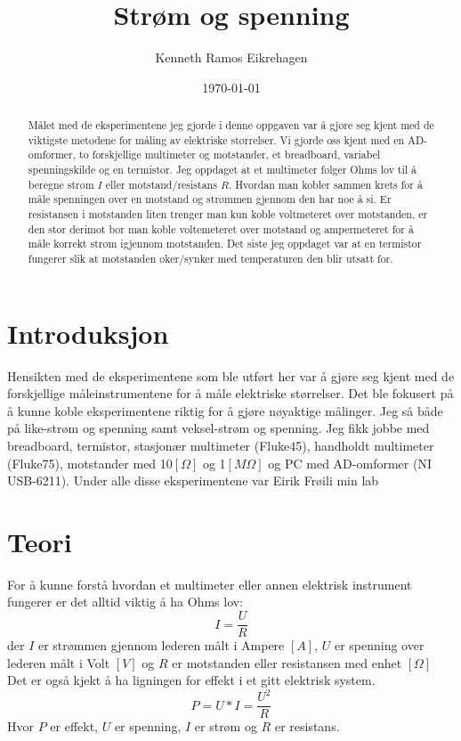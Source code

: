 \documentclass[norsk,a4paper,12pt]{article}
\title{Strøm og spenning}
\author{Kenneth Ramos Eikrehagen}
\date{\today}
\begin{document}
\renewcommand{\abstractname}{\large Sammendrag}
\renewcommand{\contentsname}{\LARGE Innhold}
\renewcommand{\listfigurename}{\Large Figur liste}
\renewcommand{\listtablename}{\Large Tabell liste}

\maketitle
\newpage
\tableofcontents
\listoffigures
\listoftables

\begin{abstract}
Målet med de eksperimentene jeg gjorde i denne oppgaven var å gjøre seg kjent med de viktigste metodene for måling av elektriske størrelser. Vi gjorde oss kjent med en AD-omformer, to forskjellige multimeter og motstander, et breadboard, variabel spenningskilde og en termistor. Jeg oppdaget at et multimeter følger Ohms lov til å beregne strøm $I$ eller motstand/resistans $R$. Hvordan man kobler sammen krets for å måle spenningen over en motstand og strømmen gjennom den har noe å si. Er resistansen i motstanden liten trenger man kun koble voltmeteret over motstanden, er den stor derimot bør man koble voltemeteret over motstand og ampermeteret for å måle korrekt strøm igjennom motstanden. Det siste jeg oppdaget var at en termistor fungerer slik at motstanden øker/synker med temperaturen den blir utsatt for. 
\end{abstract}

\section{Introduksjon}
Hensikten med de eksperimentene som ble utført her var å gjøre seg kjent med de forskjellige måleinstrumentene for å måle elektriske størrelser. Det ble fokusert på å kunne koble eksperimentene riktig for å gjøre nøyaktige målinger. Jeg så både på like-strøm og spenning samt veksel-strøm og spenning. Jeg fikk jobbe med breadboard, termistor, stasjonær multimeter (Fluke45), handholdt multimeter (Fluke75), motstander med 10$[\Omega]$ og 1$[M\Omega]$ og PC med AD-omformer (NI USB-6211). Under alle disse eksperimentene var Eirik Frøili min lab


\section{Teori}
For å kunne forstå hvordan et multimeter eller annen elektrisk instrument fungerer er det alltid viktig å ha Ohms lov: 
\begin{equation}
I = \frac{U}{R}
\label{ohm}
\end{equation}
der $I$ er strømmen gjennom lederen målt i Ampere $[A]$, $U$ er spenning over lederen målt i Volt $[V]$ og $R$ er motstanden eller resistansen med enhet $[\Omega]$ Det er også kjekt å ha ligningen for effekt i et gitt elektrisk system.
\begin{equation}
P = U*I = \frac{U^2}{R}
\label{effekt}
\end{equation}
Hvor $P$ er effekt, $U$ er spenning, $I$ er strøm og $R$ er resistans. \\
\end{document}
